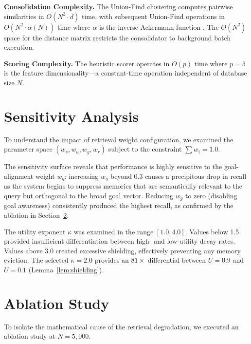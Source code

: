 \documentclass[conference]{IEEEtran}
\begin{document}
\textbf{Consolidation Complexity.} The Union-Find clustering computes pairwise similarities in $O(N^2 \cdot d)$ time, with subsequent Union-Find operations in $O(N^2 \cdot \alpha(N))$ time where $\alpha$ is the inverse Ackermann function \cite{tarjan1975uf}. The $O(N^2)$ space for the distance matrix restricts the consolidator to background batch execution.

\textbf{Scoring Complexity.} The heuristic scorer operates in $O(p)$ time where $p{=}5$ is the feature dimensionality---a constant-time operation independent of database size $N$.

\section{Sensitivity Analysis}
\label{sec:sensitivity}

To understand the impact of retrieval weight configuration, we examined the parameter space $(w_s, w_u, w_g, w_r)$ subject to the constraint $\sum w_i = 1.0$.

The sensitivity surface reveals that performance is highly sensitive to the goal-alignment weight $w_g$: increasing $w_g$ beyond 0.3 causes a precipitous drop in recall as the system begins to suppress memories that are semantically relevant to the query but orthogonal to the broad goal vector. Reducing $w_g$ to zero (disabling goal awareness) consistently produced the highest recall, as confirmed by the ablation in Section~\ref{sec:ablation}.

The utility exponent $\kappa$ was examined in the range $[1.0, 4.0]$. Values below 1.5 provided insufficient differentiation between high- and low-utility decay rates. Values above 3.0 created excessive shielding, effectively preventing any memory eviction. The selected $\kappa{=}2.0$ provides an $81\times$ differential between $U{=}0.9$ and $U{=}0.1$ (Lemma~\ref{lem:shielding}).

\section{Ablation Study}
\label{sec:ablation}
To isolate the mathematical cause of the retrieval degradation, we executed an ablation study at $N{=}5{,}000$.
\end{document}
